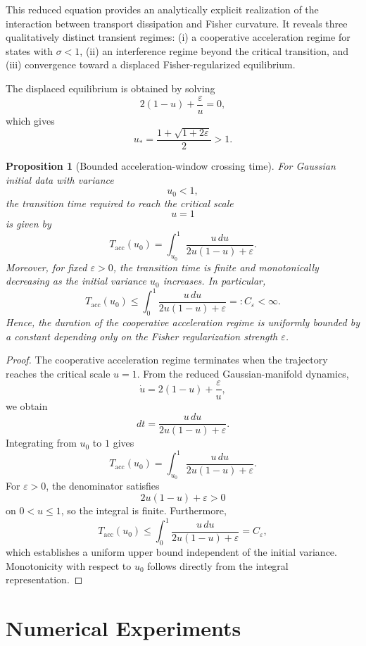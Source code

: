\documentclass[aps,prl,twocolumn,10pt,superscriptaddress]{revtex4-2}
\newtheorem{proposition}{Proposition}
\begin{document}
This reduced equation provides an analytically explicit realization of the interaction between transport dissipation and Fisher curvature. It reveals three qualitatively distinct transient regimes:
(i) a cooperative acceleration regime for states with $\sigma<1$,
(ii) an interference regime beyond the critical transition, and
(iii) convergence toward a displaced Fisher-regularized equilibrium.

The displaced equilibrium is obtained by solving
\[
2(1-u)+\frac{\varepsilon}{u}=0,
\]
which gives
\[
u_\ast
=
\frac{1+\sqrt{1+2\varepsilon}}{2}
>
1.
\]

\begin{proposition}[Bounded acceleration-window crossing time]
For Gaussian initial data with variance
\[
u_0<1,
\]
the transition time required to reach the critical scale
\[
u=1
\]
is given by
\[
T_{\mathrm{acc}}(u_0)
=
\int_{u_0}^{1}
\frac{u\,du}
{2u(1-u)+\varepsilon}.
\]
Moreover, for fixed $\varepsilon>0$, the transition time is finite and monotonically decreasing as the initial variance $u_0$ increases. In particular,
\[
T_{\mathrm{acc}}(u_0)
\le
\int_{0}^{1}
\frac{u\,du}
{2u(1-u)+\varepsilon}
=: C_\varepsilon < \infty.
\]
Hence, the duration of the cooperative acceleration regime is uniformly bounded by a constant depending only on the Fisher regularization strength $\varepsilon$.
\end{proposition}

\begin{proof}
The cooperative acceleration regime terminates when the trajectory reaches the critical scale $u=1$. From the reduced Gaussian-manifold dynamics,
\[
\dot u
=
2(1-u)
+
\frac{\varepsilon}{u},
\]
we obtain
\[
dt
=
\frac{u\,du}
{2u(1-u)+\varepsilon}.
\]
Integrating from $u_0$ to $1$ gives
\[
T_{\mathrm{acc}}(u_0)
=
\int_{u_0}^{1}
\frac{u\,du}
{2u(1-u)+\varepsilon}.
\]
For $\varepsilon>0$, the denominator satisfies
\[
2u(1-u)+\varepsilon>0
\]
on $0<u\leq 1$, so the integral is finite. Furthermore,
\[
T_{\mathrm{acc}}(u_0)
\le
\int_{0}^{1}
\frac{u\,du}
{2u(1-u)+\varepsilon}
=
C_\varepsilon,
\]
which establishes a uniform upper bound independent of the initial variance. Monotonicity with respect to $u_0$ follows directly from the integral representation.
\end{proof}



\section{Numerical Experiments}
\label{sec:numerics}
\end{document}

